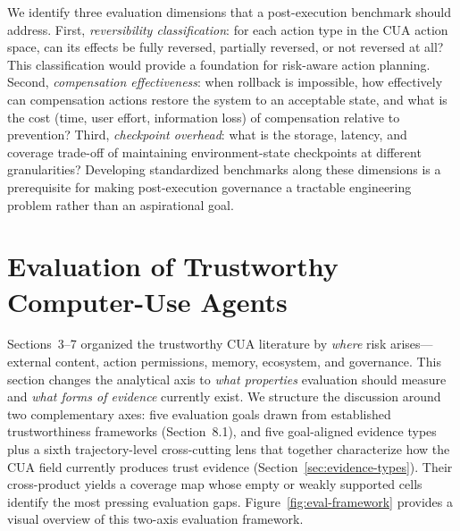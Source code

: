 We identify three evaluation dimensions that a post-execution benchmark should address. First, \emph{reversibility classification}: for each action type in the CUA action space, can its effects be fully reversed, partially reversed, or not reversed at all? This classification would provide a foundation for risk-aware action planning. Second, \emph{compensation effectiveness}: when rollback is impossible, how effectively can compensation actions restore the system to an acceptable state, and what is the cost (time, user effort, information loss) of compensation relative to prevention? Third, \emph{checkpoint overhead}: what is the storage, latency, and coverage trade-off of maintaining environment-state checkpoints at different granularities? Developing standardized benchmarks along these dimensions is a prerequisite for making post-execution governance a tractable engineering problem rather than an aspirational goal.


\section{Evaluation of Trustworthy Computer-Use Agents}
\label{sec:evaluation}

Sections~3--7 organized the trustworthy CUA literature by \emph{where} risk arises---external content, action permissions, memory, ecosystem, and governance. This section changes the analytical axis to \emph{what properties} evaluation should measure and \emph{what forms of evidence} currently exist. We structure the discussion around two complementary axes: five evaluation goals drawn from established trustworthiness frameworks (Section~8.1), and five goal-aligned evidence types plus a sixth trajectory-level cross-cutting lens that together characterize how the CUA field currently produces trust evidence (Section~\ref{sec:evidence-types}). Their cross-product yields a coverage map whose empty or weakly supported cells identify the most pressing evaluation gaps. Figure~\ref{fig:eval-framework} provides a visual overview of this two-axis evaluation framework.

